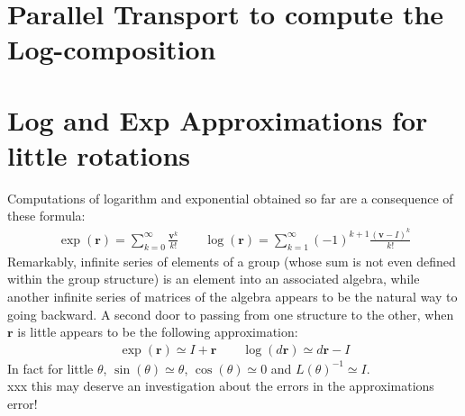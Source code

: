 \section{Parallel Transport to compute the Log-composition}




\section{Log and Exp Approximations for little rotations}
Computations of logarithm and exponential obtained so far are a consequence of these formula:
\begin{align*}
\exp(\mathbf{r}) = \sum_{k=0}^{\infty} \frac{\mathbf{v}^{k}}{k!}
\qquad 
\log(\mathbf{r}) = \sum_{k=1}^{\infty}(-1)^{k+1} \frac{(\mathbf{v}-I)^{k} }{k!}
\end{align*}
Remarkably, infinite series of elements of a group (whose sum is not even defined within the group structure) is an element into an associated algebra, while another infinite series of matrices of the algebra appears to be the natural way to going backward. A second door to passing from one structure to the other, when $\mathbf{r}$ is little appears to be the following approximation:
\begin{align*}
\exp(\mathbf{r}) \simeq I + \mathbf{r} 
\qquad 
\log(d\mathbf{r}) \simeq d\mathbf{r} - I
\end{align*}
In fact for little $\theta$, $\sin(\theta) \simeq \theta$, $\cos(\theta) \simeq 0 $ and $ L(\theta)^{-1} \simeq I$. \\
xxx this may deserve an investigation about the errors in the approximations error!


